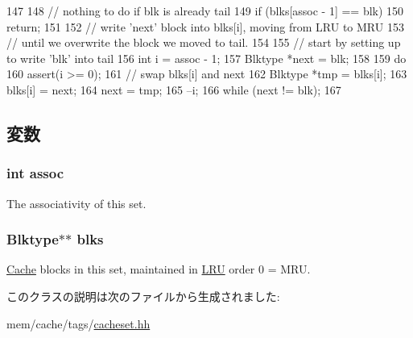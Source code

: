 \begin{DoxyCode}
147 {
148     // nothing to do if blk is already tail
149     if (blks[assoc - 1] == blk)
150         return;
151 
152     // write 'next' block into blks[i], moving from LRU to MRU
153     // until we overwrite the block we moved to tail.
154 
155     // start by setting up to write 'blk' into tail
156     int i = assoc - 1;
157     Blktype *next = blk;
158 
159     do {
160         assert(i >= 0);
161         // swap blks[i] and next
162         Blktype *tmp = blks[i];
163         blks[i] = next;
164         next = tmp;
165         --i;
166     } while (next != blk);
167 }
\end{DoxyCode}


\subsection{変数}
\hypertarget{classCacheSet_a07d90beac0f56f39fbcff30aea1863d7}{
\subsubsection[{assoc}]{\setlength{\rightskip}{0pt plus 5cm}int {\bf assoc}}}
\label{classCacheSet_a07d90beac0f56f39fbcff30aea1863d7}
The associativity of this set. \hypertarget{classCacheSet_a6e04ed065f754b0b10cbd1edfb239c64}{
\subsubsection[{blks}]{\setlength{\rightskip}{0pt plus 5cm}Blktype$\ast$$\ast$ {\bf blks}}}
\label{classCacheSet_a6e04ed065f754b0b10cbd1edfb239c64}
\hyperlink{classCache}{Cache} blocks in this set, maintained in \hyperlink{classLRU}{LRU} order 0 = MRU. 

このクラスの説明は次のファイルから生成されました:\begin{DoxyCompactItemize}
\item 
mem/cache/tags/\hyperlink{cacheset_8hh}{cacheset.hh}\end{DoxyCompactItemize}

